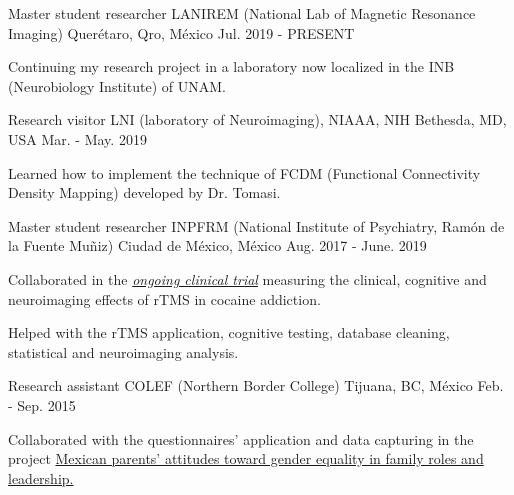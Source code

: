 \vspace{-3.2mm}
\vspace{-1.5mm}
\begin{cventries}
    \cventry
        {Master student researcher}
        {LANIREM (National Lab of Magnetic Resonance Imaging)}
        {Querétaro, Qro, México}
        {Jul. 2019 - PRESENT}
        {
            \begin{cvitems}
                \item {Continuing my research project in a laboratory now localized in the INB (Neurobiology Institute) of UNAM.}
            \end{cvitems}
        }
    \cventry
        {Research visitor}
        {LNI (laboratory of Neuroimaging), NIAAA, NIH}
        {Bethesda, MD, USA}
        {Mar. - May. 2019}
        {
            \begin{cvitems}
                \item {Learned how to implement the technique of FCDM (Functional Connectivity Density Mapping) developed by Dr. Tomasi.}
            \end{cvitems}
        }
    \cventry
        {Master student researcher}
        {INPFRM (National Institute of Psychiatry, Ramón de la Fuente Muñiz)}
        {Ciudad de México, México}
        {Aug. 2017 - June. 2019}
        {
            \begin{cvitems}
            \item {Collaborated in the \href{https://clinicaltrials.gov/ct2/show/study/NCT02986438?term=Jorge+Gonzalez-Olvera&cntry=MX&rank=2}{\textit{ongoing clinical trial}} measuring the clinical, cognitive and neuroimaging effects of rTMS in cocaine addiction.}
            \item {Helped with the rTMS application, cognitive testing, database cleaning, statistical and neuroimaging analysis.}
            \end{cvitems}
        }
        \cventry
        {Research assistant}
        {COLEF (Northern Border College)}
        {Tijuana, BC, México}
        {Feb. - Sep. 2015}
        {
            \begin{cvitems}
            \item {Collaborated with the questionnaires' application and data capturing in the project \href{https://estudiosdemograficosyurbanos.colmex.mx/index.php/edu/article/view/1791/pdf}{Mexican parents’ attitudes toward gender equality in family roles and leadership.}
            }
            \end{cvitems}
        }
\end{cventries}
